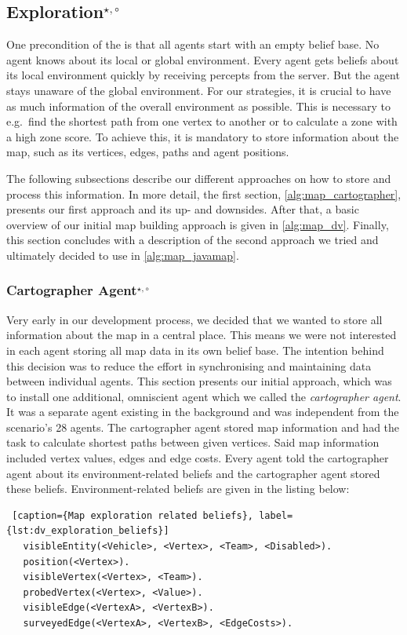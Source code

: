 \subsection[Exploration]{Exploration$^{\star,\circ}$}\label{alg:exploration} %
One precondition of the \mars{} is that all agents start with an empty belief base.
No agent knows about its local or global environment.
Every agent gets beliefs about its local environment quickly by receiving percepts from the server.
But the agent stays unaware of the global environment.
For our strategies, it is crucial to have as much information of the overall environment as possible.
This is necessary to e.g.\ find the shortest path from one vertex to another or to calculate a zone with a high zone score.
To achieve this, it is mandatory to store information about the map, such as its vertices, edges, paths and agent positions.

The following subsections describe our different approaches on how to store and process this information.
In more detail, the first section, \autoref{alg:map_cartographer}, presents our first approach and its up- and downsides.
After that, a basic overview of our initial map building approach is given in \autoref{alg:map_dv}.
Finally, this section concludes with a description of the second approach we tried and ultimately decided to use in \autoref{alg:map_javamap}.

\subsubsection[Cartographer Agent]{Cartographer Agent$^{\star,\circ}$}\label{alg:map_cartographer}
Very early in our development process, we decided that we wanted to store all information about the map in a central place.
This means we were not interested in each agent storing all map data in its own belief base.
The intention behind this decision was to reduce the effort in synchronising and maintaining data between individual agents.
This section presents our initial approach, which was to install one additional, omniscient agent which we called the \emph{cartographer agent}.
It was a separate agent existing in the background and was independent from the scenario's 28 agents.
The cartographer agent stored map information and had the task to calculate shortest paths between given vertices.
Said map information included vertex values, edges and edge costs.
Every agent told the cartographer agent about its environment-related beliefs and the cartographer agent stored these beliefs.
Environment-related beliefs are given in the listing below:
\begin{lstlisting} [caption={Map exploration related beliefs}, label={lst:dv_exploration_beliefs}]
   visibleEntity(<Vehicle>, <Vertex>, <Team>, <Disabled>).
   position(<Vertex>).
   visibleVertex(<Vertex>, <Team>).
   probedVertex(<Vertex>, <Value>).
   visibleEdge(<VertexA>, <VertexB>).
   surveyedEdge(<VertexA>, <VertexB>, <EdgeCosts>).
\end{lstlisting}

